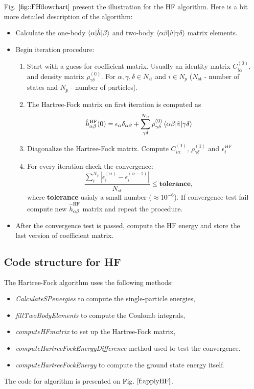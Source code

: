 \documentclass[twoside,english]{uiofysmaster}
\theoremstyle{definition}
\begin{document}
Fig. $\ref{fig::FHflowchart}$ present the illustration for the HF algorithm. Here is a bit more detailed description of the algorithm:
\begin{tcolorbox}
	\begin{itemize}
		\item Calculate the one-body $\braket{\alpha|\hat{h}|\beta}$ and two-body $\braket{\alpha\beta|\hat{v}|\gamma\delta}$ matrix elements.  \\
		\item Begin iteration procedure:
		\begin{enumerate}
			\item Start with a guess for coefficient matrix. Usually an identity matrix $C^{(0)}_{i\alpha}$,  and density matrix $\rho^{(0)}_{\gamma\delta}$. For $\alpha, \gamma, \delta \in N_{\text{st}}$ and $i \in N_{p}$ ($N_{\text{st}}$ - number of states and $N_{p}$ - number of particles). 
			\item The Hartree-Fock matrix on first iteration is computed as 
			 \[ \hat{h}^{\text{HF}}_{\alpha \beta}(0) = \epsilon_\alpha \delta_{\alpha\beta} + \sum_{\gamma\delta}^{N_{\text{st}}} \rho^{(0)}_{\gamma\delta} \braket{\alpha\beta|\hat{v}|\gamma\delta}  \] 
			 \item Diagonalize the Hartree-Fock matrix. Compute  $C^{(1)}_{i\alpha}$,   $\rho^{(1)}_{\gamma\delta}$ and $\epsilon_i^{HF}$
			 \item For every iteration check the convergence:
			 \[\frac{\sum_{i}^{N_p} |\epsilon_i^{(n)}- \epsilon_i^{(n-1)}|}{N_{st}} \leq \textbf{tolerance},\]
			 where \textbf{tolerance} usialy a small number ($\approx 10^{-6}$). If convergence test fail compute new $\hat{h}^{\text{HF}}_{\alpha \beta}$ matrix and repeat the procedure.			 	
		\end{enumerate} 
		\item After the convergence test is passed, compute the HF energy and store the last version of coefficient matrix. 
	\end{itemize}
\end{tcolorbox}

\subsection{Code structure for HF}\label{sec:code_for_HF}
The Hartree-Fock algorithm uses the following methods:
\begin{itemize}
\item \textit{CalculateSPenergies} to compute the single-particle energies,
\item \textit{fillTwoBodyElements} to compute the Coulomb integrals,
\item \textit{computeHFmatrix} to set up the Hartree-Fock matrix,
\item \textit{computeHartreeFockEnergyDifference} method used to test the convergence.
\item \textit{computeHartreeFockEnergy} to compute the ground state energy itself.
\end{itemize}
The code for algorithm is presented on Fig. $\ref{f:applyHF}$.
 
\end{document}
